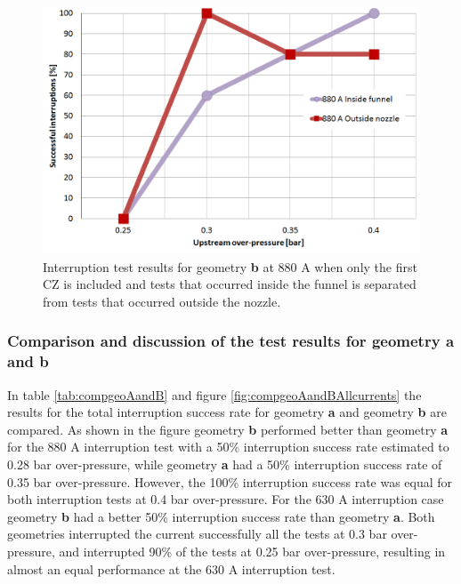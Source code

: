 \documentclass[10pt,b5paper,twoside]{article}
\begin{document}
\begin{figure}[H]
\centering
\includegraphics[scale=0.45]{Bilder/Results/geoB880ampcomp.PNG}
\caption{Interruption test results for geometry \textbf{b} at 880 A when only the first CZ is included and tests that occurred inside the funnel is separated from tests that occurred outside the nozzle.} \label{fig:results880AgeoBcomp}
\end{figure}

\subsubsection{Comparison and discussion of the test results for geometry \textbf{a} and \textbf{b}} \label{sec:compAandB}

In table \ref{tab:compgeoAandB} and figure \ref{fig:compgeoAandBAllcurrents} the results for the total interruption success rate for geometry \textbf{a} and geometry \textbf{b} are compared. As shown in the figure geometry \textbf{b} performed better than geometry \textbf{a} for the 880 A interruption test with a 50\% interruption success rate estimated to 0.28 bar over-pressure, while geometry \textbf{a} had a 50\% interruption success rate of 0.35 bar over-pressure. However, the 100\% interruption success rate was equal for both interruption tests at 0.4 bar over-pressure. For the 630 A interruption case geometry \textbf{b} had a better 50\% interruption success rate than geometry \textbf{a}. Both geometries interrupted the current successfully all the tests at 0.3 bar over-pressure, and interrupted 90\% of the tests at 0.25 bar over-pressure, resulting in almost an equal performance at the 630 A interruption test.
\end{document}
